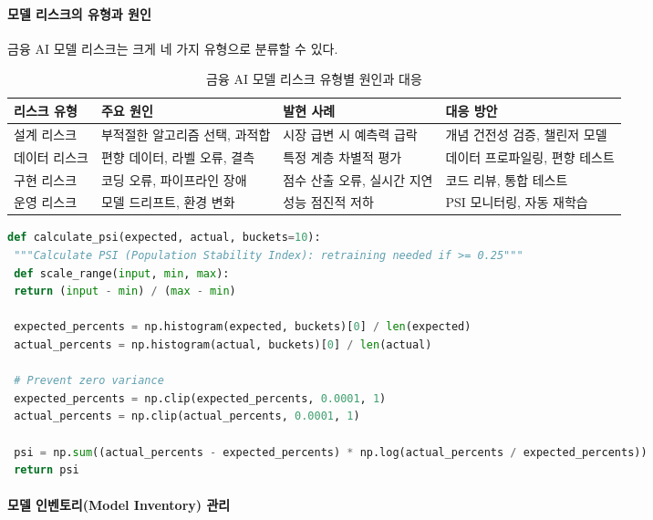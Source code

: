 \paragraph{모델 리스크의 유형과 원인}

금융 AI 모델 리스크는 크게 네 가지 유형으로 분류할 수 있다.

\begin{table}[htbp]
\centering
\caption{금융 AI 모델 리스크 유형별 원인과 대응}
\label{tab:17_risk_types}
\begin{tabularx}{\textwidth}{p{2cm}p{3cm}Xp{3cm}}
\toprule
\textbf{리스크 유형} & \textbf{주요 원인} & \textbf{발현 사례} & \textbf{대응 방안} \\
\midrule
설계 리스크 & 부적절한 알고리즘 선택, 과적합 & 시장 급변 시 예측력 급락 & 개념 건전성 검증, 챌린저 모델 \\
데이터 리스크 & 편향 데이터, 라벨 오류, 결측 & 특정 계층 차별적 평가 & 데이터 프로파일링, 편향 테스트 \\
구현 리스크 & 코딩 오류, 파이프라인 장애 & 점수 산출 오류, 실시간 지연 & 코드 리뷰, 통합 테스트 \\
운영 리스크 & 모델 드리프트, 환경 변화 & 성능 점진적 저하 & PSI 모니터링, 자동 재학습 \\
\bottomrule
\end{tabularx}
\end{table}

\begin{lstlisting}[language=Python, caption={PSI-based Model Stability Monitoring}, label={lst:psi_calc}]
def calculate_psi(expected, actual, buckets=10):
 """Calculate PSI (Population Stability Index): retraining needed if >= 0.25"""
 def scale_range(input, min, max):
 return (input - min) / (max - min)

 expected_percents = np.histogram(expected, buckets)[0] / len(expected)
 actual_percents = np.histogram(actual, buckets)[0] / len(actual)

 # Prevent zero variance
 expected_percents = np.clip(expected_percents, 0.0001, 1)
 actual_percents = np.clip(actual_percents, 0.0001, 1)

 psi = np.sum((actual_percents - expected_percents) * np.log(actual_percents / expected_percents))
 return psi
\end{lstlisting}

\paragraph{모델 인벤토리(Model Inventory) 관리}


